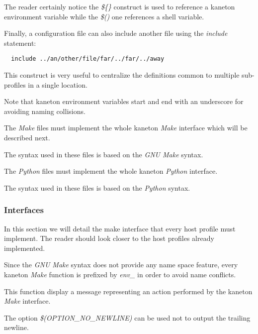 The reader certainly notice the \textit{\$\{\}} construct is used to reference
a kaneton environment variable while the \textit{\$()} one references a shell
variable.

Finally, a configuration file can also include another file using the
\textit{include} statement:

\begin{verbatim}
  include ../an/other/file/far/../far/../away
\end{verbatim}

This construct is very useful to centralize the definitions common to
multiple sub-profiles in a single location.

Note that kaneton environment variables start and end with an underscore
for avoiding naming collisions.



The \textit{Make} files must implement the whole kaneton \textit{Make}
interface which will be described next.

The syntax used in these files is based on the \textit{GNU Make} syntax.



The \textit{Python} files must implement the whole kaneton \textit{Python}
interface.

The syntax used in these files is based on the \textit{Python} syntax.

%
%

\subsubsection{Interfaces}



In this section we will detail the make interface that every host profile
must implement. The reader should look closer to the host profiles already
implemented.

Since the \textit{GNU Make} syntax does not provide any name space feature,
every kaneton \textit{Make} function is prefixed by \textit{env\_} in order
to avoid name conflicts.

         {
	   This function display a message representing an action performed
	   by the kaneton \textit{Make} interface.

	   \-

	   The option \textit{\$(OPTION\_NO\_NEWLINE)} can be used not to
	   output the trailing newline.
	 }

